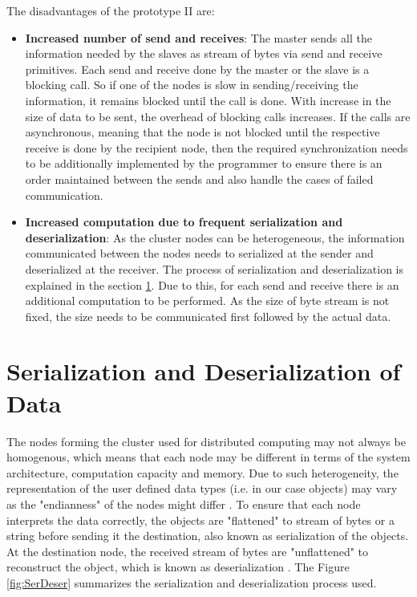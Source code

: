 The disadvantages of the prototype II are: 
\begin{itemize}
\item \textbf{Increased number of send and receives}: The master sends all the information needed by the slaves as stream of bytes via send and receive primitives. Each send and receive done by the master or the slave is a blocking call. So if one of the nodes is slow in sending/receiving the information, it remains blocked until the call is done. With increase in the size of data to be sent, the overhead of blocking calls increases. If the calls are asynchronous, meaning that the node is not blocked until the respective receive is done by the recipient node, then the required synchronization needs to be additionally implemented by the programmer to ensure there is an order maintained between the sends and also handle the cases of failed communication. 
\item \textbf{Increased computation due to frequent serialization and deserialization}: As the cluster nodes can be heterogeneous, the information communicated between the nodes needs to serialized at the sender and deserialized at the receiver. The process of serialization and deserialization is explained in the section \ref{serdser}. Due to this, for each send and receive there is an additional computation to be performed. As the size of byte stream is not fixed, the size needs to be communicated first followed by the actual data.  
\end{itemize}


\section{Serialization and Deserialization of Data} \label{serdser}

The nodes forming the cluster used for distributed computing may not always be homogenous, which means that each node may be different in terms of the system architecture, computation capacity and memory. Due to such heterogeneity, the representation of the user defined data types (i.e. in our case objects) may vary as the "endianness" of the nodes might differ \cite{ObSerDeser}. To ensure that each node interprets the data correctly, the objects are "flattened" to stream of bytes or a string before sending it the destination, also known as serialization of the objects. At the destination node, the received stream of bytes are "unflattened" to reconstruct the object, which is known as deserialization \cite{yadav2016system}. The Figure \ref{fig:SerDeser} summarizes the serialization and deserialization process used.

